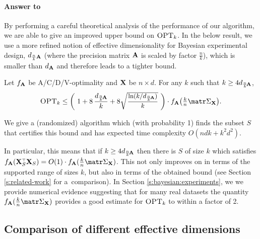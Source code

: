 \documentclass[../../thesis.tex]{subfiles}
\begin{document}
\paragraph{Answer to }
By performing a careful theoretical analysis of the performance of our
algorithm, we are able to give an improved upper bound on ${\textsc{OPT}_k}$. In the below
result, we use a more refined notion of effective dimensionality for
Bayesian experimental design,
$d_{\frac nk\mathbf A}$ (where the precision matrix $\mathbf A$ is scaled by factor $\frac
  nk$), which is smaller than $d_\mathbf A$ and therefore leads
to a tighter bound.
\begin{theorem}\label{t:q1}
  Let $f_{\mathbf A}$ be A/C/D/V-optimality and $\mathbf X$ be
  $n\times d$. For any $k$ such that $k\geq 4d_{\frac
        nk\!\mathbf A}$, %
  \begin{align*}
    \opt    \leq \bigg(\ 1+8\,\frac{d_{\frac
        nk\!\A}}{k} + 8\sqrtshort{\frac{\ln (k/d_{\frac nk\!\A})}{k}}\
    \bigg)\cdot f_{\A}\big(\tfrac kn\Sigmab_{\X}\big).
  \end{align*}
\end{theorem}
\begin{remark}
  We give a (randomized) algorithm which (with probability 1) finds
  the subset $S$ that certifies this bound and has expected time
  complexity $O(ndk+k^2d^2)$.
\end{remark}
In particular, this means that if $k\geq 4d_{\frac nk\!\mathbf A}$
then there is $S$ of size $k$
which satisfies $f_{\A}(\X_S^\top\X_S) = O(1)\cdot f_{\A}(\frac kn\Sigmab_{\X})$.
This not only improves on \cite{regularized-volume-sampling} in terms
of the supported range of sizes $k$, but also in terms of the obtained bound (see
Section \ref{s:related-work} for a~comparison). In Section
\ref{s:bayesian:experiments}, we we provide numerical evidence suggesting
that for many real datasets the quantity $f_{\A}(\frac
  kn\Sigmab_{\X})$ provides a good estimate for ${\textsc{OPT}_k}$ to within a
factor of 2.

\subsection{Comparison of different effective dimensions}
\end{document}
